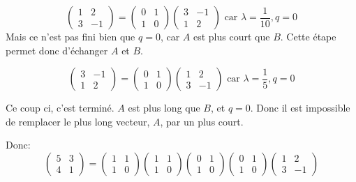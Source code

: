 \documentclass[11pt]{article}
\begin{document}
{{{$$\left( \begin{array}{cc} 1 & 2 \\
3 & -1 \end{array}\right) = \left( \begin{array}{cc} 0 & 1 \\
1 & 0  \end{array}\right) \left( \begin{array}{cc} 3 & -1 \\
1 & 2  \end{array}\right) \mbox{ car } \lambda=\frac{1}{10}, q=0 $$ Mais ce n'est pas fini bien que $q=0$, car $A$ est plus court que $B$. Cette étape permet donc d'échanger $A$ et $B$.

$$\left( \begin{array}{cc} 3 & -1 \\
1 & 2 \end{array}\right) = \left( \begin{array}{cc} 0 & 1 \\
1 & 0  \end{array}\right) \left( \begin{array}{cc} 1 & 2 \\
3 & -1  \end{array}\right) \mbox{ car } \lambda=\frac{1}{5}, q=0 $$ 

Ce coup ci, c'est terminé. $A$ est plus long que $B$, et $q=0$. Donc il est impossible de remplacer le plus long vecteur, $A$, par un plus court. 

Donc:
$$\left( \begin{array}{cc} 5 & 3 \\
4 & 1 \end{array}\right) = 
\left( \begin{array}{cc} 1 & 1 \\
1 & 0 \end{array}\right) 
\left( \begin{array}{cc} 1 & 1 \\
1 & 0  \end{array}\right)  
\left( \begin{array}{cc} 0 & 1 \\
1 & 0  \end{array}\right)  
\left( \begin{array}{cc} 0 & 1 \\
1 & 0  \end{array}\right)\left( \begin{array}{cc}  1 & 2 \\
3 & -1  \end{array}\right)$$

}}}
\end{document}
